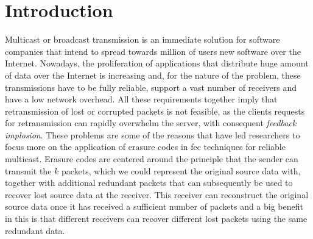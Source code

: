 \section{Introduction}
\label{sec:intro}
Multicast or broadcast transmission is an immediate solution for software companies that intend to spread towards million of users new software over the Internet. Nowadays, the proliferation of applications that distribute huge amount of data over the Internet is increasing and, for the nature of the problem, these transmissions have to be fully reliable, support a vast number of receivers and have a low network overhead. All these requirements together imply that retransmission of lost or corrupted packets is not feasible, as the clients requests for retransmission can rapidly overwhelm the server, with consequent \textit{feedback implosion}. \cite{Byers} These problems are some of the reasons that have led researchers to focus more on the application of erasure codes in \gls{fec} techniques for reliable multicast. Erasure codes are centered around the principle that the sender can transmit the $k$ packets, which we could represent the original source data with, together with additional redundant packets that can subsequently be used to recover lost source data at the receiver. This receiver can reconstruct the original source data once it has received a sufficient number of packets and a big benefit in this is that different receivers can recover different lost packets using the same redundant data.\cite{Byers}
